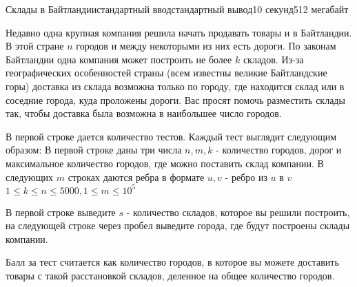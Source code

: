 \begin{problem}{Склады в Байтландии}{стандартный ввод}{стандартный вывод}{10 секунд}{512 мегабайт}

Недавно одна крупная компания решила начать продавать товары и в Байтландии. В этой стране $n$ городов и между некоторыми из них есть дороги. По законам Байтландии одна компания может построить не более $k$ складов. Из-за географических особенностей страны (всем известны великие Байтландские горы) доставка из склада возможна только по городу, где находится склад или в соседние города, куда проложены дороги. 
Вас просят помочь разместить склады так, чтобы доставка была возможна в наибольшее число городов.

\InputFile
В первой строке дается количество тестов.
Каждый тест выглядит следующим образом:
В первой строке даны три числа $n, m, k$ - количество городов, дорог и максимальное количество городов, где можно поставить склад компании.
В следующих $m$ строках даются ребра в формате $u, v$ - ребро из $u$ в $v$
$1 \le k \le n \le 5000, 1 \le m \le 10^5$

\OutputFile
В первой строке выведите $s$ - количество складов, которое вы решили построить, на следующей строке через пробел выведите города, где будут построены склады компании.

\Example

\begin{example}
%
\end{example}

\Note
Балл за тест считается как количество городов, в которое вы можете доставить товары с такой расстановкой складов, деленное на общее количество городов.

\end{problem}

